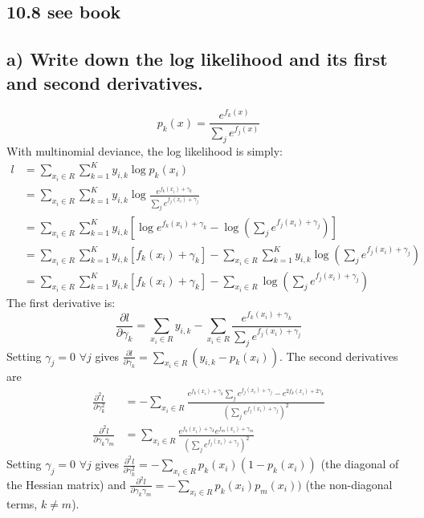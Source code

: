 \subsection*{10.8 see book}
\subsection*{a) Write down the log likelihood and its first and second derivatives.}
$$p_k(x) = \frac{e^{f_k(x)}}{\sum_j e^{f_j(x)}}$$
With multinomial deviance, the log likelihood is simply:
\begin{align*}
    l &= \sum_{x_i \in R} \sum_{k=1}^K y_{i,k} \log p_k(x_i)\\
    &= \sum_{x_i \in R} \sum_{k=1}^K y_{i,k} \log \frac{e^{f_k(x_i) + \gamma_k}}{\sum_j e^{f_j(x_i) + \gamma_j}} \\
    &= \sum_{x_i \in R} \sum_{k=1}^K y_{i,k} \left[\log e^{f_k(x_i) + \gamma_k} - \log \left( \sum_j e^{f_j(x_i) + \gamma_j}\right) \right]\\
    &= \sum_{x_i \in R} \sum_{k=1}^K y_{i,k} \left[f_k(x_i) + \gamma_k\right]  - \sum_{x_i \in R} \sum_{k=1}^K y_{i,k} \log \left( \sum_j e^{f_j(x_i) + \gamma_j}\right)\\
    &= \sum_{x_i \in R} \sum_{k=1}^K y_{i,k} \left[f_k(x_i) + \gamma_k\right]  - \sum_{x_i \in R} \log \left( \sum_j e^{f_j(x_i) + \gamma_j}\right)
\end{align*}
The first derivative is:
$$\frac{\partial l}{\partial \gamma_k} = \sum_{x_i \in R} y_{i,k} - \sum_{x_i \in R} \frac{e^{f_k(x_i) + \gamma_k}}{ \sum_j e^{f_j(x_i) + \gamma_j}}$$
Setting $\gamma_j = 0$ $\forall j$ gives $\frac{\partial l}{\partial \gamma_k} = \sum_{x_i \in R} (y_{i,k} - p_k(x_i))$.
The second derivatives are
\begin{align*}
    \frac{\partial^2 l}{\partial \gamma_k^2} &= -\sum_{x_i \in R} \frac{e^{f_k(x_i) + \gamma_k} \sum_j e^{f_j(x_i) + \gamma_j} - e^{2f_k(x_i) + 2\gamma_k}}{ \left(\sum_j e^{f_j(x_i) + \gamma_j}\right)^2}\\
    \frac{\partial^2 l}{\partial \gamma_k\gamma_m} &= \sum_{x_i \in R} \frac{e^{f_k(x_i) + \gamma_k}e^{f_m(x_i) + \gamma_m}}{ \left(\sum_j e^{f_j(x_i) + \gamma_j}\right)^2}
\end{align*}
Setting $\gamma_j = 0$ $\forall j$ gives $\frac{\partial^2 l}{\partial \gamma_k^2} = -\sum_{x_i \in R} p_k(x_i) (1 - p_k(x_i))$ (the diagonal of the Hessian matrix) and $\frac{\partial^2 l}{\partial \gamma_k \gamma_m} = -\sum_{x_i \in R} p_k(x_i) p_m(x_i))$ (the non-diagonal terms, $k \neq m$).

